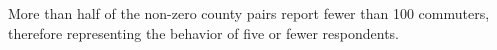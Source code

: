 More than half of the non-zero county pairs report fewer than 100 commuters, therefore representing the behavior of five or fewer respondents.%
